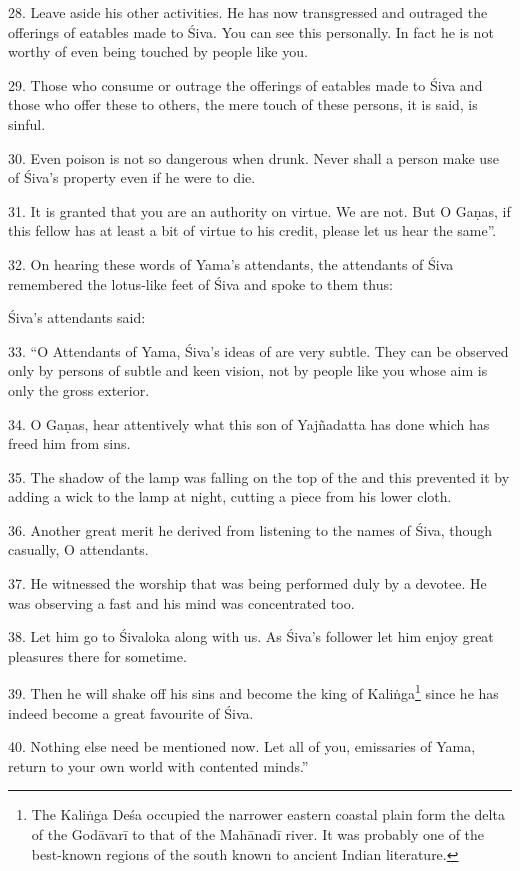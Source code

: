 28. Leave aside his other activities. He has now transgressed and outraged
the offerings of eatables made to Śiva. You can see this personally. In fact he
is not worthy of even being touched by people like you.

29. Those who consume or outrage the offerings of eatables made to Śiva and
those who offer these to others, the mere touch of these persons, it is said,
is sinful.

30. Even poison is not so dangerous when drunk. Never shall a person make use of
Śiva’s property even if he were to die.

31. It is granted that you are an authority on virtue. We are not. But O Gaṇas,
if this fellow has at least a bit of virtue to his credit, please let us hear
the same”.

32. On hearing these words of Yama’s attendants, the attendants of Śiva
remembered the lotus-like feet of Śiva and spoke to them thus:

Śiva’s attendants said:

33. “O Attendants of Yama, Śiva’s ideas of  are very subtle. They can
be observed only by persons of subtle and keen vision, not by people like you
whose aim is only the gross exterior.

34. O Gaṇas, hear attentively what this son of Yajñadatta has done which has
freed him from sins.

35. The shadow of the lamp was falling on the top of the  and this
 prevented it by adding a wick to the lamp at night, cutting
a piece from his lower cloth.

36. Another great merit he derived from listening to the names of Śiva, though
casually, O attendants.

37. He witnessed the worship that was being performed duly by a devotee. He was
observing a fast and his mind was concentrated too.

38. Let him go to Śivaloka along with us. As Śiva’s follower let him enjoy great
pleasures there for sometime.

39. Then he will shake off his sins and become the king of Kaliṅga\footnote{The
Kaliṅga Deśa occupied the narrower eastern coastal plain form the delta of the
Godāvarī to that of the Mahānadī river. It was probably one of the best-known
regions of the south known to ancient Indian literature.} since he has indeed
become a great favourite of Śiva.

40. Nothing else need be mentioned now. Let all of you, emissaries of Yama,
return to your own world with contented minds.”

